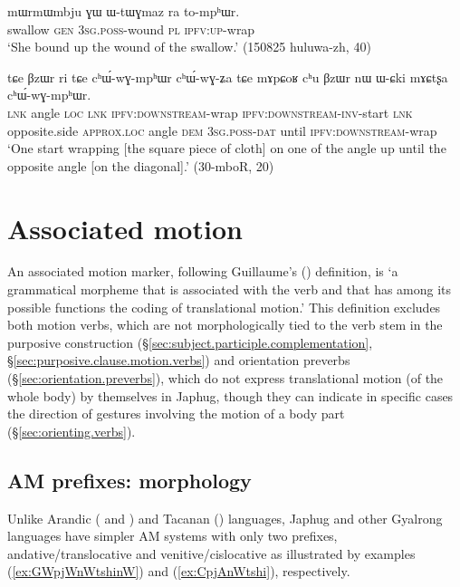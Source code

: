 \begin{exe}
\ex \label{ex:WtWGmaz.tomphWr}
\gll mɯrmɯmbju ɣɯ ɯ-tɯɣmaz ra to-mpʰɯr. \\
swallow \textsc{gen} \textsc{3sg}.\textsc{poss}-wound \textsc{pl} \textsc{ipfv}:\textsc{up}-wrap \\
\glt `She bound up the wound of the swallow.' (150825 huluwa-zh, 40)
  \end{exe}
  
\begin{exe}
\ex \label{ex:chWwGmphWr.chWwGZa}
\gll  tɕe βzɯr ri tɕe cʰɯ́-wɣ-mpʰɯr cʰɯ́-wɣ-ʑa tɕe  mɤpɕoʁ cʰu βzɯr nɯ ɯ-ɕki mɤɕtʂa cʰɯ́-wɣ-mpʰɯr. \\
\textsc{lnk} angle \textsc{loc} \textsc{lnk} \textsc{ipfv}:\textsc{downstream}-wrap \textsc{ipfv}:\textsc{downstream}-\textsc{inv}-start \textsc{lnk} opposite.side \textsc{approx}.\textsc{loc} angle \textsc{dem} \textsc{3sg}.\textsc{poss}-\textsc{dat} until \textsc{ipfv}:\textsc{downstream}-wrap \\
\glt `One start wrapping [the square piece of cloth] on one of the angle up until the opposite angle [on the diagonal].' (30-mboR, 20)
 \end{exe}
  
\section{Associated motion} \label{sec:associated.motion}
An associated motion marker, following Guillaume's (\citeyear[13]{guillaume16am}) definition, is `a grammatical morpheme that is associated with the verb and that has among its possible functions the coding of translational motion.' This definition excludes both motion verbs, which are not morphologically tied to the verb stem in the purposive construction (§\ref{sec:subject.participle.complementation}, §\ref{sec:purposive.clause.motion.verbs}) and orientation preverbs (§\ref{sec:orientation.preverbs}), which do not express translational motion (of the whole body) by themselves in Japhug, though they can indicate in specific cases the direction of gestures involving the motion of a body part (§\ref{sec:orienting.verbs}).


\subsection{AM prefixes: morphology} \label{sec:am.prefixes}

Unlike Arandic (\citealt{koch84associated.motion} and \citealt{wilkins91associated.motion}) and Tacanan (\citealt{guillaume09mouv.assoc}) languages, Japhug and other Gyalrong languages have simpler AM systems with only two prefixes, andative/translocative and venitive/cislocative  as illustrated by examples (\ref{ex:GWpjWnWtshinW}) and (\ref{ex:CpjAnWtshi}), respectively.

